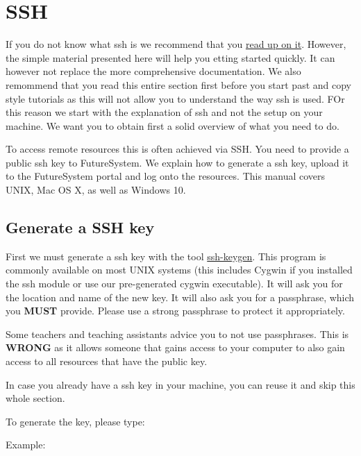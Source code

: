 \chapter{SSH}
\label{C:ssh}

If you do not know what ssh is we recommend that you
\href{http://openssh.com/manual.html}{read up on it}. However, the
simple material presented here will help you etting started quickly. It
can however not replace the more comprehensive documentation. We also
remommend that you read this entire section first before you start
past and copy style tutorials as this will not allow you to understand
the way ssh is used. FOr this reason we start with the explanation of
ssh and not the setup on your machine. We want you to obtain first a
solid overview of what you need to do.

To access remote resources this is often achieved via SSH. You need to
provide a public ssh key to FutureSystem. We explain how to generate a
ssh key, upload it to the FutureSystem portal and log onto the
resources. This manual covers UNIX, Mac OS X, as well as Windows 10.



\section{Generate a SSH key}\label{generate-a-ssh-key}

First we must generate a ssh key with the tool
\href{http://linux.die.net/man/1/ssh-keygen}{ssh-keygen}. This program
is commonly available on most UNIX systems (this includes Cygwin if
you installed the ssh module or use our pre-generated cygwin
executable). It will ask you for the location and name of the new
key. It will also ask you for a passphrase, which you \textbf{MUST}
provide. Please use a strong passphrase to protect it
appropriately.

\begin{WARNING}
  Some teachers and teaching assistants advice you to not use
  passphrases. This is \textbf{WRONG} as it allows someone that gains
  access to your computer to also gain access to all resources that
  have the public key.
\end{WARNING}

In case you already have a ssh key in your machine, you can reuse it and
skip this whole section.

To generate the key, please type:

Example:

